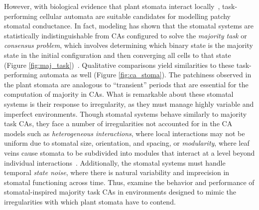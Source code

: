 \documentclass[a4paper,11pt]{article}
\begin{document}
However, with biological evidence that plant stomata interact locally~\cite{pe04}, task-performing cellular automata are suitable candidates for modelling patchy stomatal conductance. In fact, modeling has shown that the stomatal systems are statistically indistinguishable from CAs configured to solve the \textit{majority task} or \textit{consensus problem}, which involves determining which binary state is the majority state in the initial configuration and then converging all cells to that state (Figure \ref{fig:maj_task})~\cite{gr15}. Qualitative comparisons yield similarities to these task-performing automata as well (Figure \ref{fig:ca_stoma}). The patchiness observed in the plant stomata are analogous to ``transient'' periods that are essential for the computation of majority in CAs. What is remarkable about these stomatal systems is their response to irregularity, as they must manage highly variable and imperfect environments. Though stomatal systems behave similarly to majority task CAs, they face a number of irregularities not accounted for in the CA models such as \textit{heterogeneous interactions}, where local interactions may not be uniform due to stomatal size, orientation, and spacing,  or \textit{modularity}, where leaf veins cause stomata to be subdivided into modules that interact at a level beyond individual interactions~\cite{me07}. Additionally, the stomatal systems must handle temporal \textit{state noise}, where there is natural variability and imprecision in stomatal functioning across time. Thus, \citeauthor{me07} examine the behavior and performance of stomatal-inspired majority task CAs in environments designed to mimic the irregularities with which plant stomata have to contend.
\end{document}
